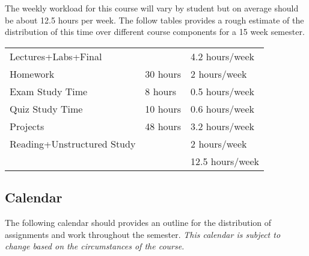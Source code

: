 \documentclass[10pt]{article}
\begin{document}
The weekly workload for this course will vary by student but on average should be about 12.5 hours per week.  The follow tables provides a rough estimate of the distribution of this time over different course components for a 15 week semester. 
\begin{center}
\begin{tabular}{|l|l|l|}
\hline
Lectures+Labs+Final &      & 4.2 hours/week \\ 
Homework & 30 hours        & 2 hours/week \\
Exam Study Time & 8 hours  & 0.5 hours/week \\ 
Quiz Study Time & 10 hours & 0.6 hours/week \\
Projects & 48 hours        & 3.2 hours/week \\
Reading+Unstructured Study & & 2 hours/week \\
\hline 
& & 12.5 hours/week \\ 
\hline
\end{tabular}
\end{center}


\subsection{Calendar}

The following calendar should provides an outline for the distribution of assignments and work throughout the semester.  \textit{This calendar is subject to change based on the circumstances of the course.} 
\end{document}
